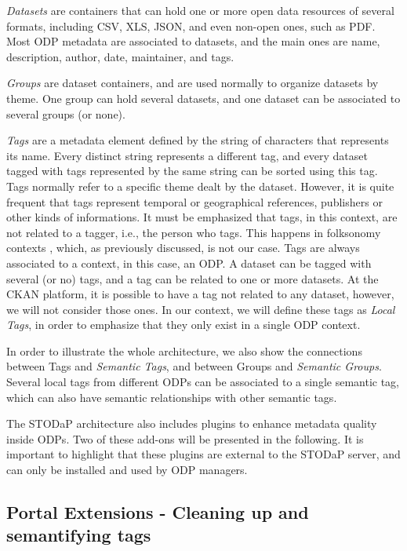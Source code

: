 \emph{Datasets} are containers that can hold one or more open data resources of several formats, including CSV, XLS, JSON, and even non-open ones, such as PDF.
Most ODP metadata are associated to datasets, and the main ones are name, description, author, date, maintainer, and tags.

\emph{Groups} are dataset containers, and are used normally to organize datasets by theme. One group can hold several datasets, and one dataset can be associated to several groups (or none).

\emph{Tags} are a metadata element defined by the string of characters that represents its name.
Every distinct string represents a different tag, and every dataset tagged with tags represented by the same string can be sorted using this tag.
Tags normally refer to a specific theme dealt by the dataset.
However, it is quite frequent that tags represent temporal or geographical references, publishers or other kinds of informations.
It must be emphasized that tags, in this context, are not related to a tagger, i.e., the person who tags.
This happens in folksonomy contexts \cite{Grubber2007}, which, as previously discussed, is not our case.
Tags are always associated to a context, in this case, an ODP.
A dataset can be tagged with several (or no) tags, and a tag can be related to one or more datasets.
At the CKAN platform, it is possible to have a tag not related to any dataset, however, we will not consider those ones.
In our context, we will define these tags as \emph{Local Tags}, in order to emphasize that they only exist in a single ODP context.

In order to illustrate the whole architecture, we also show the connections between Tags and \emph{Semantic Tags}, and between Groups and \emph{Semantic Groups}.
Several local tags from different ODPs can be associated to a single semantic tag, which can also have semantic relationships with other semantic tags.

The STODaP architecture also includes plugins to enhance metadata quality inside ODPs.
Two of these add-ons will be presented in the following.
It is important to highlight that these plugins are external to the STODaP server, and can only be installed and used by ODP managers.

\subsection{Portal Extensions - Cleaning up and semantifying tags}
\label{sec:tag_manager_plugin}

